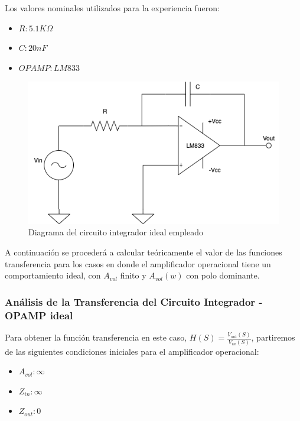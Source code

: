 Los valores nominales utilizados para la experiencia fueron:

\begin{itemize}
	\item $R: 5.1K \Omega$ 
	\item $C: 20nF$
	\item $OPAMP: LM833$
\end{itemize}

\begin{figure}[H]
    \centering 
    \includegraphics [scale=0.5] {../Ejercicio3-CircuitoIntegradoresyDerivadores/Imagenes/diagrama-integrador.png} 
    \caption{Diagrama del circuito integrador ideal empleado}
    \label{fig:emptyPlotTool}
\end{figure}

A continuación se procederá a calcular teóricamente el valor de las funciones transferencia para los casos en 
donde el amplificador operacional tiene un comportamiento ideal, con $A_{vol}$ finito y $A_{vol}(w)$ con polo dominante.

\subsubsection{Análisis de la Transferencia del Circuito Integrador - OPAMP ideal}

Para obtener la función transferencia en este caso, $H(S) = \frac{V_{out} (S)}{V_{in} (S)}$, partiremos de las siguientes condiciones
iniciales para el amplificador operacional:

\begin{itemize}
	\item $A_{vol}: \infty$
	\item $Z_{in}: \infty$
	\item $Z_{out}: 0$
\end{itemize}

